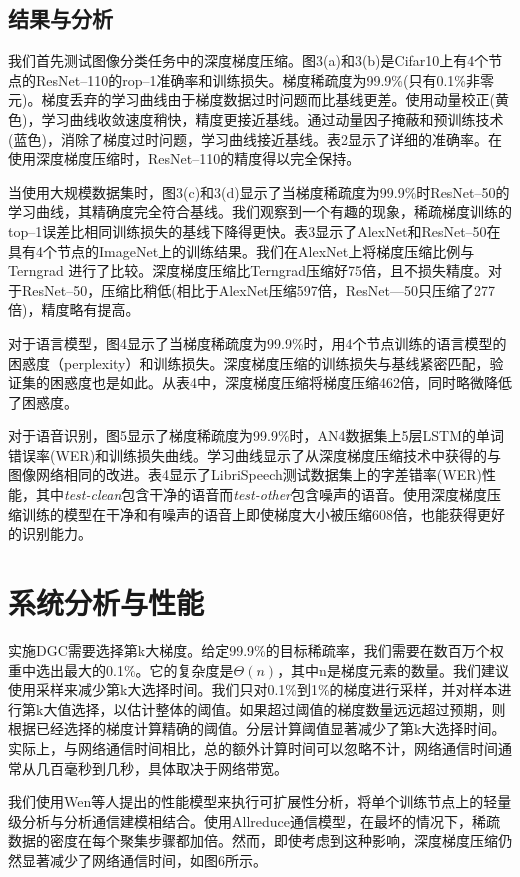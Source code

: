\subsection{结果与分析}
我们首先测试图像分类任务中的深度梯度压缩。图3(a)和3(b)是Cifar10上有4个节点的ResNet--110的rop--1准确率和训练损失。梯度稀疏度为99.9\%(只有0.1\%非零元)。梯度丢弃的学习曲线由于梯度数据过时问题而比基线更差。使用动量校正(黄色)，学习曲线收敛速度稍快，精度更接近基线。通过动量因子掩蔽和预训练技术(蓝色)，消除了梯度过时问题，学习曲线接近基线。表2显示了详细的准确率。在使用深度梯度压缩时，ResNet--110的精度得以完全保持。

当使用大规模数据集时，图3(c)和3(d)显示了当梯度稀疏度为99.9\%时ResNet--50的学习曲线，其精确度完全符合基线。我们观察到一个有趣的现象，稀疏梯度训练的top--1误差比相同训练损失的基线下降得更快。表3显示了AlexNet和ResNet--50在具有4个节点的ImageNet上的训练结果。我们在AlexNet上将梯度压缩比例与Terngrad 进行了比较。深度梯度压缩比Terngrad压缩好75倍，且不损失精度。对于ResNet--50，压缩比稍低(相比于AlexNet压缩597倍，ResNet—50只压缩了277倍)，精度略有提高。

对于语言模型，图4显示了当梯度稀疏度为99.9\%时，用4个节点训练的语言模型的困惑度（perplexity）和训练损失。深度梯度压缩的训练损失与基线紧密匹配，验证集的困惑度也是如此。从表4中，深度梯度压缩将梯度压缩462倍，同时略微降低了困惑度。

对于语音识别，图5显示了梯度稀疏度为99.9\%时，AN4数据集上5层LSTM的单词错误率(WER)和训练损失曲线。学习曲线显示了从深度梯度压缩技术中获得的与图像网络相同的改进。表4显示了LibriSpeech测试数据集上的字差错率(WER)性能，其中\emph{test-clean}包含干净的语音而\emph{test-other}包含噪声的语音。使用深度梯度压缩训练的模型在干净和有噪声的语音上即使梯度大小被压缩608倍，也能获得更好的识别能力。

\section{系统分析与性能}
实施DGC需要选择第k大梯度。给定99.9\%的目标稀疏率，我们需要在数百万个权重中选出最大的0.1\%。它的复杂度是$\Theta(n)$，其中n是梯度元素的数量。我们建议使用采样来减少第k大选择时间。我们只对0.1\%到1\%的梯度进行采样，并对样本进行第k大值选择，以估计整体的阈值。如果超过阈值的梯度数量远远超过预期，则根据已经选择的梯度计算精确的阈值。分层计算阈值显著减少了第k大选择时间。实际上，与网络通信时间相比，总的额外计算时间可以忽略不计，网络通信时间通常从几百毫秒到几秒，具体取决于网络带宽。

我们使用Wen等人提出的性能模型来执行可扩展性分析，将单个训练节点上的轻量级分析与分析通信建模相结合。使用Allreduce通信模型，在最坏的情况下，稀疏数据的密度在每个聚集步骤都加倍。然而，即使考虑到这种影响，深度梯度压缩仍然显著减少了网络通信时间，如图6所示。

